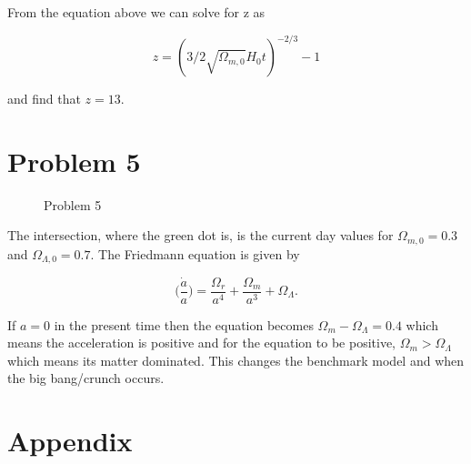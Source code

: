 \documentclass[12pt]{article}
\begin{document}
From the equation above we can solve for z as 

$$
z = (3/2\sqrt{\Omega_{m,0}}H_{0}t)^{-2/3} - 1
$$

and find that $z = 13$.

\section*{Problem 5}

\begin{figure}[h!]
    \centering
    \qquad
    \caption{Problem 5}%
    \label{fig:example}%
\end{figure}

The intersection, where the green dot is, is the current day values for $\Omega_{m,0} = 0.3$ and $\Omega_{\Lambda,0} = 0.7$. The Friedmann equation is given by 

$$
\Big(\frac{\dot{a}}{a}\Big) = \frac{\Omega_{r}}{a^{4}} + \frac{\Omega_{m}}{a^3} + \Omega_{\Lambda}. 
$$

If $a = 0$ in the present time then the equation becomes $\Omega_{m} - \Omega_{\Lambda} = 0.4$ which means the acceleration is positive and for the equation to be positive, $\Omega_{m} > \Omega_{\Lambda}$ which means its matter dominated. This changes the benchmark model and when the big bang/crunch occurs. 

\section*{Appendix}
\end{document}
